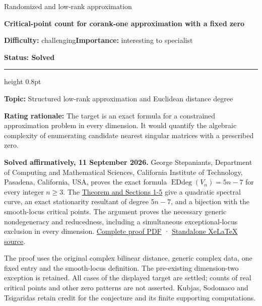 \documentclass[11pt,a4paper]{article}
\makeatletter
\renewcommand{\subsection}{\Needspace{4\baselineskip}\@startsection{subsection}{2}{0pt}{9pt plus 1pt minus 1pt}{3pt}{\sffamily\bfseries\normalsize\color{ink}}}
\makeatother
\begin{document}
{\sffamily\small\color{muted}Randomized and low-rank approximation\par}
\vspace{3pt}
{\raggedright{}\sffamily\bfseries\fontsize{21}{24}\selectfont\color{ink}Critical-point
count for corank-one approximation with a fixed zero\par}
\vspace{7pt}
{\sffamily\small\textbf{Difficulty:} challenging\quad\textbf{Importance:} interesting
to specialist\par}
{\sffamily\small\bfseries\color{accent}Status: Solved\par}
\vspace{4pt}
{\color{accent}\hrule height 0.8pt}
\vspace{6pt}
\textbf{Topic:} Structured low-rank approximation and Euclidean distance
degree

\textbf{Rating rationale:} The target is an exact formula for a
constrained approximation problem in every dimension. It would quantify
the algebraic complexity of enumerating candidate nearest singular
matrices with a prescribed zero.

\subsection{Resolution}\label{resolution}

\textbf{Solved affirmatively, 11 September 2026.} George Stepaniants,
Department of Computing and Mathematical Sciences, California Institute
of Technology, Pasadena, California, USA, proves the exact formula
\(\operatorname{EDdeg}(V_n)=5n-7\) for every integer \(n\ge3\). The
\href{https://github.com/ajt60gaibb/OpenProblemsInNLA/blob/main/randomized-and-low-rank-approximation/RA-19/solution.md}{Theorem
and Sections 1-5} give a quadratic spectral curve, an exact stationarity
resultant of degree \(5n-7\), and a bijection with the smooth-locus
critical points. The argument proves the necessary generic nondegeneracy
and reducedness, including a simultaneous exceptional-locus exclusion in
every dimension.
\href{https://github.com/ajt60gaibb/OpenProblemsInNLA/blob/main/randomized-and-low-rank-approximation/RA-19/solution.pdf}{Complete
proof PDF} ·
\href{https://github.com/ajt60gaibb/OpenProblemsInNLA/blob/main/randomized-and-low-rank-approximation/RA-19/solution.tex}{Standalone
XeLaTeX source}.

The proof uses the original complex bilinear distance, generic complex
data, one fixed entry and the smooth-locus definition. The pre-existing
dimension-two exception is retained. All cases of the displayed target
are settled; counts of real critical points and other zero patterns are
not asserted. Kubjas, Sodomaco and Tsigaridas retain credit for the
conjecture and its finite supporting computations.
\end{document}
